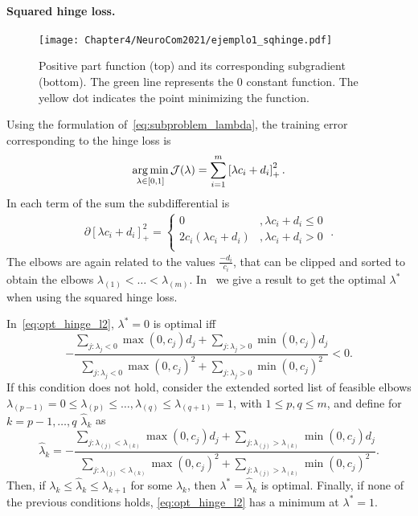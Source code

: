 \paragraph*{Squared hinge loss.\\}
\begin{figure}[t!]
    \centering
    \texttt{[image: Chapter4/NeuroCom2021/ejemplo1\_sqhinge.pdf]}
    \caption{Positive part function (top) and its corresponding subgradient (bottom). The green line represents the $0$ constant function. The yellow dot indicates the point minimizing the function.}
    \label{fig:sqhinge_loss}
\end{figure}
Using the formulation of~\eqref{eq:subproblem_lambda}, the training error corresponding to the hinge loss is
\begin{equation}
    \label{eq:opt_hinge_l2}
    \argmin_{\lambda \in [0, 1]} \mathcal{J}(\lambda) = \sum_{i=1}^{\npertask} \pospart{\lambda c_i + d_i}^2.
\end{equation}
In each term of the sum the subdifferential is 
\begin{align*}
    \partial \left[\lambda c_i + d_i \right]_+^2 = 
    \begin{cases}
        0 &, \lambda c_i + d_i  \leq 0 \\
        2 c_i (\lambda c_i + d_i) &, \lambda c_i + d_i  > 0 \\
    \end{cases} \; .
\end{align*}
The elbows are again related to the values $\frac{-d_i}{c_i}$, that can be clipped and sorted to obtain the elbows ${\lambda}_{(1)} < \ldots < {\lambda}_{(m)}$.
In~\citet[Proposition 2]{RuizAD21} we give a result to get the optimal $\lambda^*$ when using the squared hinge loss.
\begin{prop}\label{prop:sqhinge_neurocom2020}
    In~\eqref{eq:opt_hinge_l2},
    $\lambda^*=0$ is optimal iff 
    \begin{equation}\nonumber
         - \frac{\sum_{j: \lambda_{j} < 0} \max(0, c_{j}) d_{j} + \sum_{j: \lambda_{j} > 0} \min(0, c_{j}) d_{j}}{\sum_{j: \lambda_{j} < 0} \max(0, c_{j})^2 + \sum_{j: \lambda_{j} > 0} \min(0, c_{j})^2} < 0.
       \end{equation}
    If this condition does not hold, 
    consider the extended sorted list of feasible elbows $\lambda_{(p-1)} = 0 \leq \lambda_{(p)} \leq \ldots, \lambda_{(q)} \leq \lambda_{(q+1)}=1$, with $1 \leq p, q \leq m$, and
    define for $k=p-1, \ldots,  q$ $\widehat{\lambda}_k$ as %
\begin{equation}\label{sol_hinge_2}
 \widehat{\lambda}_k = - \frac{\sum_{j: \lambda_{(j)} < \lambda_{(k)}} \max(0, c_{j}) d_{j} + \sum_{j: \lambda_{(j)} > \lambda_{(k)}} \min(0, c_{j}) d_{j}}{\sum_{j: \lambda_{(j)} < \lambda_{(k)}} \max(0, c_{j})^2 + \sum_{j: \lambda_{(j)} > \lambda_{(k)}} \min(0, c_{j})^2} .
\end{equation}
%
Then, if $\lambda_k \leq \widehat{\lambda}_k \leq  \lambda_{k+1}$ for some $\widehat{\lambda}_k$, then $\lambda^* = \widehat{\lambda}_k$ is optimal.
Finally, if none of the previous conditions holds, \eqref{eq:opt_hinge_l2} has a minimum at $\lambda^* = 1$.
\end{prop}
